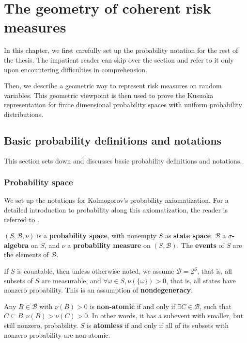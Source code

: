 
\chapter{The geometry of coherent risk measures}
\label{chapter_finite_dimensional}

In this chapter, we first carefully set up the probability notation for the rest of the thesis. The impatient reader can skip over the section and refer to it only upon encountering difficulties in comprehension.

Then, we describe a geometric way to represent risk measures on random variables. This geometric viewpoint is then used to prove the Kusuoka representation for finite dimensional probability spaces with uniform probability distributions.

\section{Basic probability definitions and notations}
This section sets down and discusses basic probability definitions and notations.

\subsection{Probability space}
We set up the notations for Kolmogorov's probability axiomatization. For a detailed introduction to probability along this axiomatization, the reader is referred to \cite{chungCourseProbabilityTheory2001a}.

\begin{notn}\label{notn:probspace}
\((S, \mathcal{B}, \nu)\) is a \textbf{probability space}, with nonempty \(S\) as \textbf{state space}, \(\mathcal{B}\) a \textbf{\(\sigma\)-algebra} on \(S\), and \(\nu\) a \textbf{probability measure} on \((S, \mathcal{B})\). The \textbf{events} of $S$ are the elements of $\mathcal{B}$.
\end{notn}

\begin{conv}
If \(S\) is countable, then unless otherwise noted, we assume \(\mathcal{B} = 2^S\), that is, all subsets of \(S\) are measurable, and \(\forall \omega\in S, \nu(\{\omega\} ) > 0\), that is, all states have nonzero probability. This is an assumption of \textbf{nondegeneracy}.
\end{conv}

\begin{defn}
Any \(B \in \mathcal{B}\) with \( \nu(B) > 0\) is \textbf{non-atomic} if and only if \(\exists C \in \mathcal{B}\), such that \(C \subseteq B, \nu(B) > \nu(C) > 0\). In other words, it has a subevent with smaller, but still nonzero, probability. \(S\) is \textbf{atomless} if and only if all of its subsets with nonzero probability are non-atomic.
\end{defn}

